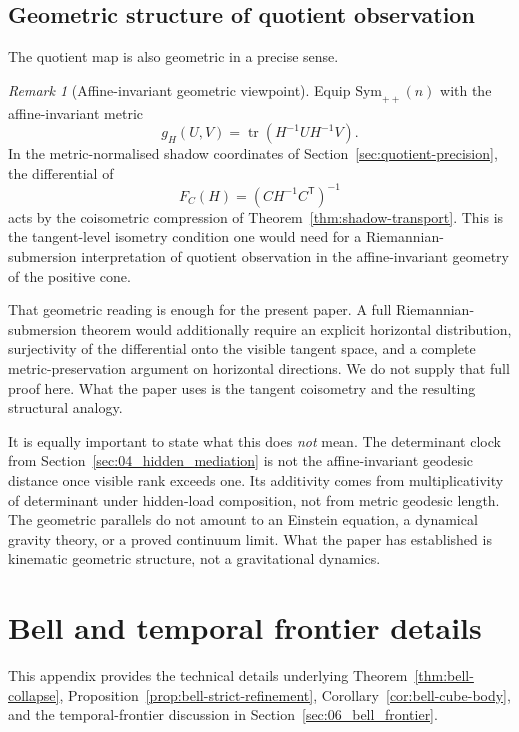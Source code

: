\documentclass[11pt]{article}
\numberwithin{equation}{section}
\newcommand{\Sym}{\mathrm{Sym}}
\theoremstyle{thmcompact}
\theoremstyle{remark}
\newtheorem*{remarkplain}{Remark}
\newenvironment{remark}[1][]%
{\begin{remarkbox}\begin{remarkplain}[#1]\normalfont}
		{\end{remarkplain}\end{remarkbox}}
\begin{document}
\subsection{Geometric structure of quotient observation}

The quotient map is also geometric in a precise sense.

\begin{remark}[Affine-invariant geometric viewpoint]
Equip $\Sym_{++}(n)$ with the affine-invariant metric
\[
g_H(U,V)=\operatorname{tr}(H^{-1}UH^{-1}V).
\]
In the metric-normalised shadow coordinates of Section~\ref{sec:quotient-precision}, the differential of
\[
F_C(H)=(CH^{-1}C^{\mathsf T})^{-1}
\]
acts by the coisometric compression of Theorem~\ref{thm:shadow-transport}. This is the tangent-level isometry condition one would need for a Riemannian-submersion interpretation of quotient observation in the affine-invariant geometry of the positive cone.

That geometric reading is enough for the present paper. A full Riemannian-submersion theorem would additionally require an explicit horizontal distribution, surjectivity of the differential onto the visible tangent space, and a complete metric-preservation argument on horizontal directions. We do not supply that full proof here. What the paper uses is the tangent coisometry and the resulting structural analogy.

It is equally important to state what this does \emph{not} mean. The determinant clock from Section~\ref{sec:04_hidden_mediation} is not the affine-invariant geodesic distance once visible rank exceeds one. Its additivity comes from multiplicativity of determinant under hidden-load composition, not from metric geodesic length. The geometric parallels do not amount to an Einstein equation, a dynamical gravity theory, or a proved continuum limit. What the paper has established is kinematic geometric structure, not a gravitational dynamics.
\end{remark}

\appendix

\section{Bell and temporal frontier details}\label{app:bell}

This appendix provides the technical details underlying Theorem~\ref{thm:bell-collapse}, Proposition~\ref{prop:bell-strict-refinement}, Corollary~\ref{cor:bell-cube-body}, and the temporal-frontier discussion in Section~\ref{sec:06_bell_frontier}.
\end{document}
